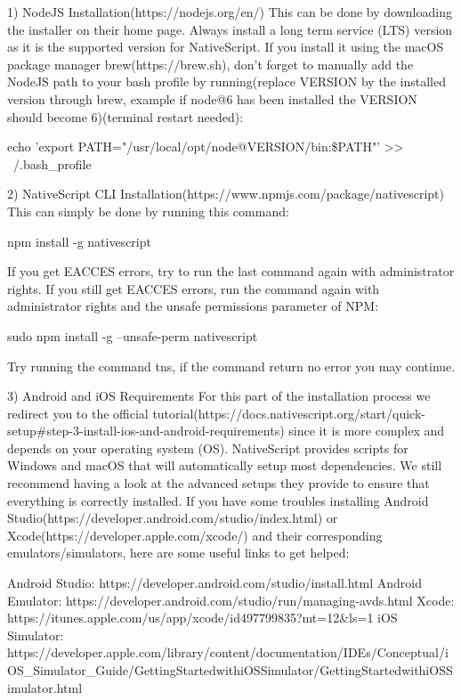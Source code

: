     1) NodeJS Installation(https://nodejs.org/en/)
    This can be done by downloading the installer on their home page. Always install a long term service (LTS) version as it is the supported version for NativeScript. If you install it using the macOS package manager brew(https://brew.sh), don't forget to manually add the NodeJS path to your bash profile by running(replace {VERSION} by the installed version through brew, example if node@6 has been installed the {VERSION} should become 6)(terminal restart needed):

        echo 'export PATH="/usr/local/opt/node@{VERSION}/bin:\$PATH"' >> ~/.bash\_profile

    2) NativeScript CLI Installation(https://www.npmjs.com/package/nativescript)
    This can simply be done by running this command:

        npm install -g nativescript

    If you get EACCES errors, try to run the last command again with administrator rights. If you still get EACCES errors, run the command again with administrator rights and the unsafe permissions parameter of NPM:

        sudo npm install -g --unsafe-perm nativescript

    Try running the command tns, if the command return no error you may continue.

    3) Android and iOS Requirements
    For this part of the installation process we redirect you to the official tutorial(https://docs.nativescript.org/start/quick-setup\#step-3-install-ios-and-android-requirements) since it is more complex and depends on your operating system (OS). NativeScript provides scripts for Windows and macOS that will automatically setup most dependencies. We still recommend having a look at the advanced setups they provide to ensure that everything is correctly installed.
    If you have some troubles installing Android Studio(https://developer.android.com/studio/index.html) or Xcode(https://developer.apple.com/xcode/) and their corresponding emulators/simulators, here are some useful links to get helped:

        Android Studio: https://developer.android.com/studio/install.html
        Android Emulator: https://developer.android.com/studio/run/managing-avds.html
        Xcode: https://itunes.apple.com/us/app/xcode/id497799835?mt=12\&ls=1
        iOS Simulator: https://developer.apple.com/library/content/documentation/IDEs/Conceptual/iOS\_Simulator\_Guide/GettingStartedwithiOSSimulator/GettingStartedwithiOSSimulator.html

